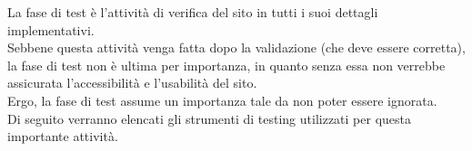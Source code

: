 La fase di test è l'attività di verifica del sito in tutti i suoi dettagli implementativi.\\ 
Sebbene questa attività venga fatta dopo la validazione (che deve essere corretta), la fase di test non è ultima per importanza, in quanto
senza essa non verrebbe assicurata l'accessibilità e l'usabilità del sito.\\
Ergo, la fase di test assume un importanza tale da non poter essere ignorata.\\
Di seguito verranno elencati gli strumenti di testing utilizzati per questa importante attività.
